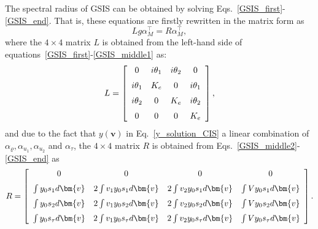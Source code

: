 The spectral radius of GSIS can be obtained by solving Eqs.~\eqref{GSIS_first}-\eqref{GSIS_end}. That is, these equations are firstly rewritten in the matrix form as
\begin{equation}
L{g}\alpha_M^\top=R\alpha_M^\top,
\end{equation} 
where the $4\times4$ matrix $L$ is obtained from the left-hand side of equations~\eqref{GSIS_first}-\eqref{GSIS_middle1} as:
\begin{equation}\label{GSIS_L}
L=\left[ \begin {array}{cccccc} 
0& i\theta_1& i\theta_2 &0 
\\ \noalign{\medskip}
i\theta_1 &K_e &0 &i\theta_1 
\\ \noalign{\medskip}
i\theta_2 &0 &K_e &i\theta_2 
\\ \noalign{\medskip}
0  &0  & 0 &K_e
\end {array} \right], 
\end{equation}
and due to the fact that $y(\bm{v})$ in Eq.~\eqref{y_solution_CIS} a linear combination of $\alpha_\varrho, \alpha_{u_1}, \alpha_{u_2}$ and $\alpha_{\tau}$, the $4\times4$ matrix $R$ is obtained from Eqs.~\eqref{GSIS_middle2}-\eqref{GSIS_end} as 
\begin{equation}\label{GSIS_R}
R=\left[ \begin {array}{cccccc} 
0& 0 & 0 & 0 
\\ \noalign{\medskip}
\int{y_0s_1d\bm{v}} & 2\int{v_1y_0s_1d\bm{v}}& 2\int{v_2y_0s_1d\bm{v}} & \int{Vy_0s_1d\bm{v}}
\\ \noalign{\medskip}
\int{y_0s_2d\bm{v}} & 2\int{v_1y_0s_2d\bm{v}}& 2\int{v_2y_0s_2d\bm{v}} & \int{Vy_0s_2d\bm{v}}
\\ \noalign{\medskip}
\int{y_0s_\tau{}d\bm{v}} & 2\int{v_1y_0s_\tau{}d\bm{v}}& 2\int{v_2y_0s_\tau{}d\bm{v}} & \int{Vy_0s_\tau{}d\bm{v}}
\end {array} \right].
\end{equation}

